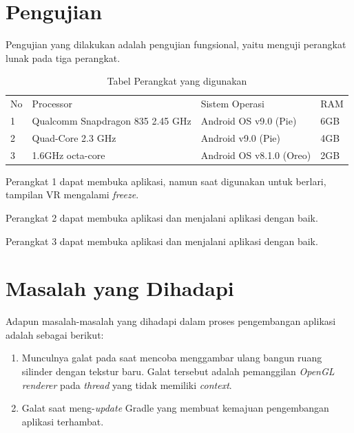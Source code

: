 \section{Pengujian}

Pengujian yang dilakukan adalah pengujian fungsional, yaitu menguji perangkat lunak pada tiga perangkat. 

\begin{table}[]
    \centering
    \begin{tabular}{|p{1cm}||p{4cm}|p{4cm}|p{3cm}|}
    \hline\\
    \hline
       No  & Processor & Sistem Operasi & RAM \\
    \hline
        1 &  Qualcomm Snapdragon 835 2.45 GHz & Android OS v9.0 (Pie) & 6GB\\
    \hline
        2 &  Quad-Core 2.3 GHz & Android v9.0 (Pie) & 4GB \\
    \hline
        3 &  1.6GHz octa-core & Android OS v8.1.0 (Oreo) & 2GB\\
    \hline
    \end{tabular}
    \caption{Tabel Perangkat yang digunakan}
    \label{tab:pengujian-perangkat}
\end{table} 

Perangkat 1 dapat membuka aplikasi, namun saat digunakan untuk berlari, tampilan VR mengalami \textit{freeze}.

Perangkat 2 dapat membuka aplikasi dan menjalani aplikasi dengan baik. 

Perangkat 3 dapat membuka aplikasi dan menjalani aplikasi dengan baik. 


\section{Masalah yang Dihadapi}
Adapun masalah-masalah yang dihadapi dalam proses pengembangan aplikasi adalah sebagai berikut:

\begin{enumerate}
	\item Munculnya galat pada saat mencoba menggambar ulang bangun ruang silinder dengan tekstur baru. Galat tersebut adalah pemanggilan \textit{OpenGL renderer} pada \textit{thread} yang tidak memiliki \textit{context}. 
	
	\item Galat saat meng-\textit{update} Gradle yang membuat kemajuan pengembangan aplikasi terhambat.
\end{enumerate}

